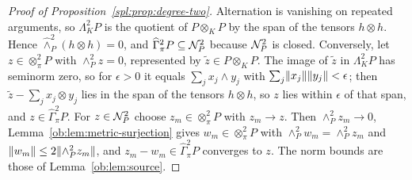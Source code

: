 \begin{proof}[Proof of Proposition~\ref{spl:prop:degree-two}]
Alternation is vanishing on repeated arguments, so $\Lambda^2_KP$ is the quotient of $P\otimes_KP$ by the span of the
tensors $h\otimes h$. Hence $\widehat\wedge^2_P(h\otimes h)=0$, and $\widehat\Gamma^2_\pi P\subseteq\mathcal N^2_P$ because
$\mathcal N^2_P$ is closed. Conversely, let $z\in\otimes^2_\pi P$ with $\wedge^2_Pz=0$, represented by $\tilde z\in P\otimes_KP$.
The image of $\tilde z$ in $\Lambda^2_KP$ has seminorm zero, so for $\epsilon>0$ it equals $\sum_jx_j\wedge y_j$ with
$\sum_j\lVert x_j\rVert\lVert y_j\rVert<\epsilon$; then $\tilde z-\sum_jx_j\otimes y_j$ lies in the span of the tensors $h\otimes h$,
so $z$ lies within $\epsilon$ of that span, and $z\in\widehat\Gamma^2_\pi P$. For $z\in\mathcal N^2_P$ choose $z_m\in\otimes^2_\pi P$ with $z_m\to z$. Then
$\wedge^2_Pz_m\to0$, Lemma~\ref{ob:lem:metric-surjection} gives $w_m\in\otimes^2_\pi P$ with $\wedge^2_Pw_m=\wedge^2_Pz_m$
and $\lVert w_m\rVert\le2\lVert \wedge^2_Pz_m\rVert$, and $z_m-w_m\in\widehat\Gamma^2_\pi P$ converges to $z$. The norm bounds are
those of Lemma~\ref{ob:lem:source}.
\end{proof}
